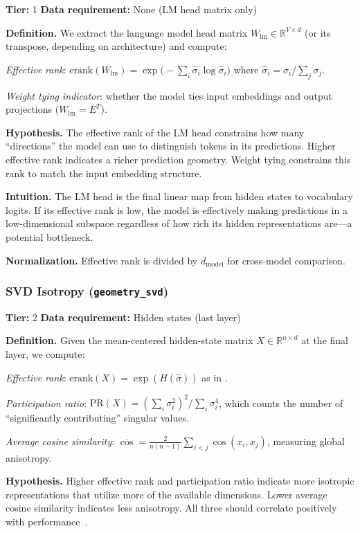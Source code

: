 \documentclass{article}
\begin{document}
\textbf{Tier:} 1 \quad \textbf{Data requirement:} None (LM head matrix only)

\textbf{Definition.}
We extract the language model head matrix $W_{\text{lm}} \in \mathbb{R}^{V \times d}$ (or its transpose, depending on architecture) and compute:

\emph{Effective rank}: $\text{erank}(W_{\text{lm}}) = \exp\!\bigl(-\sum_i \hat\sigma_i \log \hat\sigma_i\bigr)$ where $\hat\sigma_i = \sigma_i / \sum_j \sigma_j$.

\emph{Weight tying indicator}: whether the model ties input embeddings and output projections ($W_{\text{lm}} = E^T$).

\textbf{Hypothesis.}
The effective rank of the LM head constrains how many ``directions'' the model can use to distinguish tokens in its predictions. Higher effective rank indicates a richer prediction geometry. Weight tying constrains this rank to match the input embedding structure.

\textbf{Intuition.}
The LM head is the final linear map from hidden states to vocabulary logits. If its effective rank is low, the model is effectively making predictions in a low-dimensional subspace regardless of how rich its hidden representations are---a potential bottleneck.

\textbf{Normalization.} Effective rank is divided by $d_{\text{model}}$ for cross-model comparison.

\subsubsection{SVD Isotropy (\texttt{geometry\_svd})}
\label{app:svd}

\textbf{Tier:} 2 \quad \textbf{Data requirement:} Hidden states (last layer)

\textbf{Definition.}
Given the mean-centered hidden-state matrix $X \in \mathbb{R}^{n \times d}$ at the final layer, we compute:

\emph{Effective rank}: $\text{erank}(X) = \exp(H(\hat\sigma))$ as in .

\emph{Participation ratio}: $\text{PR}(X) = (\sum_i \sigma_i^2)^2 / \sum_i \sigma_i^4$, which counts the number of ``significantly contributing'' singular values.

\emph{Average cosine similarity}: $\overline{\cos} = \frac{2}{n(n-1)} \sum_{i<j} \cos(x_i, x_j)$, measuring global anisotropy.

\textbf{Hypothesis.}
Higher effective rank and participation ratio indicate more isotropic representations that utilize more of the available dimensions. Lower average cosine similarity indicates less anisotropy. All three should correlate positively with performance~\citep{ethayarajh2019contextual,cai2021isotropy}.
\end{document}
